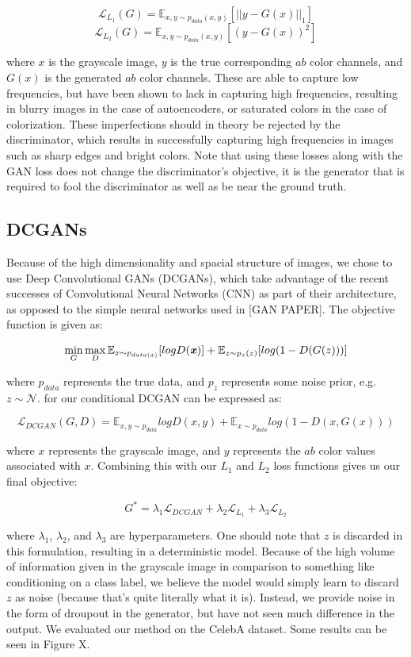 \documentclass[10pt]{article}
\begin{document}
\[ \mathcal{L}_{L_1}(G) = \mathbb{E}_{x,y\sim p_{data}(x,y)}[||y-G(x)||_1] \]
\[ \mathcal{L}_{L_2}(G) = \mathbb{E}_{x,y\sim p_{data}(x,y)}[(y-G(x))^2] \]


\noindent where $x$ is the grayscale image, $y$ is the true corresponding $ab$ color channels, and $G(x)$ is the generated $ab$ color channels. These are able to capture low frequencies, but have been shown to lack in 
capturing high frequencies, resulting in blurry images in the case of autoencoders, or saturated colors in
the case of colorization. These imperfections should in theory be rejected by the discriminator, which
results in successfully capturing high frequencies in images such as sharp edges and bright colors. Note
that using these losses along with the GAN loss does not change the discriminator's objective, it is the
generator that is required to fool the discriminator as well as be near the ground truth.

\subsection{DCGANs}
Because of the high dimensionality and spacial structure of images, we chose to use Deep Convolutional GANs
(DCGANs), which take advantage of the recent successes of Convolutional Neural Networks (CNN) as part of
their architecture, as opposed to the simple neural networks used in [GAN PAPER]. The objective function is
given as:

\[\min\limits_{G}\max\limits_{D} \mathbb{E}_{x \sim p_{data(x)}} [logD(\textbf{\textit{x}})] + \mathbb{E}_{z \sim p_z(z)}[log(1 - D(G(z)))]\]

\noindent where $p_{data}$ represents the true data, and $p_z$ represents some noise prior, e.g.
$z \sim \mathcal{N}$. 
for our conditional DCGAN can be expressed as:

\[ \mathcal{L}_{DCGAN}(G,D) = \mathbb{E}_{x,y \sim p_{data}} log D(x,y) + \mathbb{E}_{x \sim p_{data}}
log (1-D(x, G(x)))\]

\noindent where $x$ represents the grayscale image, and $y$ represents the $ab$ color values associated with
$x$. Combining this with our $L_1$ and $L_2$ loss functions gives us our final objective:

\[ G^* = \lambda_1 \mathcal{L}_{DCGAN} + \lambda_2 \mathcal{L}_{L_1} + \lambda_3 \mathcal{L}_{L_2} \]

\noindent where $\lambda_1$, $\lambda_2$, and $\lambda_3$ are hyperparameters. One should note that $z$
is discarded in this formulation, resulting in a deterministic model. Because of the high volume of information
given in the grayscale image in comparison to something like
conditioning on a class label, we believe the model would simply learn to discard $z$ as noise
(because that's quite literally what it is). Instead, we provide noise in the form of droupout in the
generator, but have not seen much difference in the output. We evaluated our method on the CelebA
dataset. Some results can be seen in Figure X. 
\end{document}
